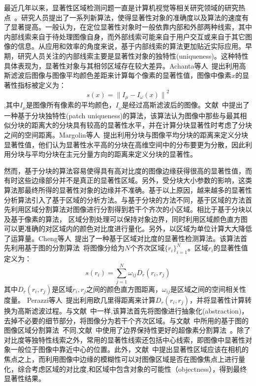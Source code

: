 最近几年以来，显著性区域检测问题一直是计算机视觉等相关研究领域的研究热点~\cite{saliencySurvey}。研究人员提出了一系列新算法，使得显著性对象的准确度以及算法的速度有了显著提高。一般认为，在定位显著性对象时一般依靠内部和外部两种线索\cite{saliencySurvey}，其中内部线索来自于待处理图像自身，而外部线索可能来自于用户交互或来自于其它图像的信息。从应用和效率的角度来说，基于内部线索的算法更加贴近实际应用。早期，研究人员关注的内部线索主要是显著性对象的独特性(uniqueness)。这种特性具体表现为，显著性对象与其相邻区域存在较大差异。Achanta等人~\cite{frequenyTuned}提出利用高斯滤波后图像与图像平均颜色差距来计算每个像素的显著性值，图像中像素$x$的显著性指标被定义为：
$$s(x)={\parallel I_{\mu }-I_{\omega}(x)\parallel}^{2}$$
,其中$I_{\mu }$是图像所有像素的平均颜色，$I_{\omega}$是经过高斯滤波后的图像。文献~中提出了一种基于分块独特性(patch uniqueness)的算法，该算法认为图像中那些与最其相似分块的距离大的分块具有较高的显著性水平，并在计算分块显著性时考虑了分块之间的空间距离。Margolin等人~\cite{whatmakes}提出利用分块与图像平均分块的距离来定义分块显著性值，他们认为显著性水平高的分块在高维空间中的分布要更为分散，因此利用分块与平均分块在主元分量方向的距离来定义分块的显著性。\par
然而，基于分块的算法容易使得具有高对比度的图像边缘获得很高的显著性值，而有时这些边缘部分并不是真正的显著性区域。另外，受分块大小参数的影响，这类算法那最终所得的显著性对象的边缘并不准确。基于以上原因，越来越多的显著性分析算法引入了基于区域的分析方法。与基于分块的方法不同，基于区域的方法首先利用区域分割算法对图像进行分割得到若干个齐次的小区域。相比于基于分块以及基于像素的算法， 区域分割处理可以保持对象边界，同时利用区域颜色直方图可以更准确的对区域内的颜色对比度进行量化。另外，以区域为单位计算大大降低了运算量。Cheng等人~\cite{ChengPAMI}提出了一种基于区域对比度的显著性检测算法。该算法首先利用基于图的分割算法~\cite{graphseg}将图像分给为$N$个齐次区域$\{r_{i}\}_{i=1}^{N}$。区域$r_{i}$的显著性值定义为：
$$s(r_{i})=\sum_{j=1}^{N}\omega_{ij}D_{r}(r_{i},r_{j})$$
其中$D_{r}(r_{i},r_{j})$是区域$r_{i},r_{j}$之间的颜色直方图距离，$\omega_{ij}$是区域之间的空间相关性度量。
Perazzi等人~\cite{saliencyFilter}提出利用欧几里得距离来计算$D_{r}(r_{i},r_{j})$，并将显著性计算转换为高斯滤波过程。与文献~中一样,该算法首先将图像进行抽象化(abstraction)，去掉不必要的细节部分，将图像分为若干个齐次区域。与文献~中所用的基于图的图像区域分割算法~\cite{graphseg}不同,文献~中使用了边界保持性更好的超像素分割算法~\cite{SLIC}。除了对比度等独特性线索之外，常用的显著性线索还包括中心线索，即图像中显著性对象一般位于图像中靠近中心的位置。此外，文献~中提出显著性区域应该在相机的焦点之上，而利用图像中边缘的模糊性可以对图像区域是否在图像焦点上进行量化，综合考虑区域的对比度,和区域中包含对象的可能性（objectness），得到最终显著性结果。\par
